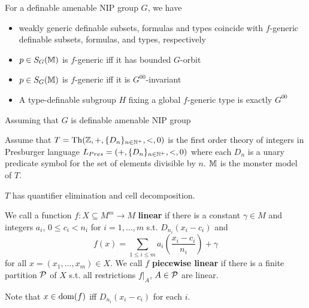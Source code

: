 \documentclass[11pt]{article}
\begin{document}
\begin{fact}[]
\label{fact1.4}
For a definable amenable NIP group \(G\), we have
\begin{itemize}
\item weakly generic definable subsets, formulas and types coincide with \(f\)-generic definable
subsets, formulas, and types, respectively
\item \(p\in S_G(\mathbb{M})\) is \(f\)-generic iff it has bounded \(G\)-orbit
\item \(p\in S_G(\mathbb{M})\) is \(f\)-generic iff it is \(G^{00}\)-invariant
\item A type-definable subgroup \(H\) fixing a global \(f\)-generic type is exactly \(G^{00}\)
\end{itemize}
\end{fact}

\begin{remark}
Assuming that \(G\) is definable amenable NIP group
\end{remark}

Assume that \(T=\operatorname{Th}(\mathbb{Z},+,\{D_n\}_{n\in\mathbb{N}^+},<,0)\) is the first order theory of integers in Presburger
language \(L_{Pres}=(+,\{D_n\}_{n\in\mathbb{N}^+},<,0)\) where each \(D_n\) is a unary predicate symbol
for the set of elements divisible by \(n\). \(\mathbb{M}\) is the monster model of \(T\).

\(T\) has quantifier elimination and cell decomposition.

\begin{definition}[]
We call a function \(f:X\subseteq M^m\to M\) \textbf{linear} if there is a constant \(\gamma\in M\) and
integers \(a_i\), \(0\le c_i<n_i\) for \(i=1,\dots,m\) s.t. \(D_{n_i}(x_i-c_i)\) and
\begin{equation*}
f(x)=\sum_{1\le i\le m}a_i(\frac{x_i-c_i}{n_i})+\gamma
\end{equation*}
for all \(x=(x_1,\dots,x_m)\in X\). We call \(f\) \textbf{piecewise linear} if there is a finite partition \(\mathcal{P}\)
of \(X\) s.t. all restrictions \(f|_A\), \(A\in\mathcal{P}\) are linear.
\end{definition}

Note that \(x\in\operatorname{dom}(f)\) iff \(D_{n_i}(x_i-c_i)\) for each \(i\).
\end{document}
